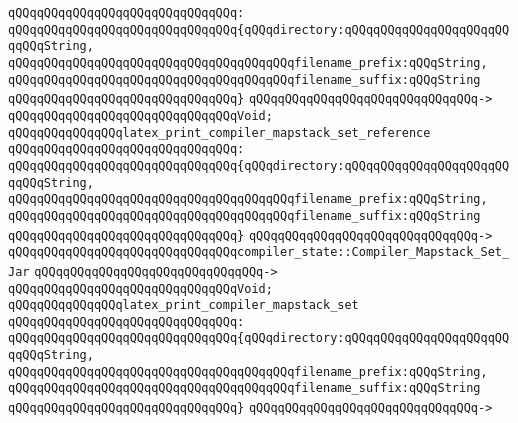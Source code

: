 \verb|qQQqqQQqqQQqqQQqqQQqqQQqqQQqqQQq:|\newline
\verb|qQQqqQQqqQQqqQQqqQQqqQQqqQQqqQQq{qQQqdirectory:qQQqqQQqqQQqqQQqqQQqqQQqqQQqString,|\newline
\verb|qQQqqQQqqQQqqQQqqQQqqQQqqQQqqQQqqQQqqQQqfilename_prefix:qQQqString,|\newline
\verb|qQQqqQQqqQQqqQQqqQQqqQQqqQQqqQQqqQQqqQQqfilename_suffix:qQQqString|\newline
\verb|qQQqqQQqqQQqqQQqqQQqqQQqqQQqqQQq}|\newline
\verb|qQQqqQQqqQQqqQQqqQQqqQQqqQQqqQQq->|\newline
\verb|qQQqqQQqqQQqqQQqqQQqqQQqqQQqqQQqVoid;|\newline
\newline
\verb|qQQqqQQqqQQqqQQqlatex_print_compiler_mapstack_set_reference|\newline
\verb|qQQqqQQqqQQqqQQqqQQqqQQqqQQqqQQq:|\newline
\verb|qQQqqQQqqQQqqQQqqQQqqQQqqQQqqQQq{qQQqdirectory:qQQqqQQqqQQqqQQqqQQqqQQqqQQqString,|\newline
\verb|qQQqqQQqqQQqqQQqqQQqqQQqqQQqqQQqqQQqqQQqfilename_prefix:qQQqString,|\newline
\verb|qQQqqQQqqQQqqQQqqQQqqQQqqQQqqQQqqQQqqQQqfilename_suffix:qQQqString|\newline
\verb|qQQqqQQqqQQqqQQqqQQqqQQqqQQqqQQq}|\newline
\verb|qQQqqQQqqQQqqQQqqQQqqQQqqQQqqQQq->|\newline
\verb|qQQqqQQqqQQqqQQqqQQqqQQqqQQqqQQqcompiler_state::Compiler_Mapstack_Set_Jar|\newline
\verb|qQQqqQQqqQQqqQQqqQQqqQQqqQQqqQQq->|\newline
\verb|qQQqqQQqqQQqqQQqqQQqqQQqqQQqqQQqVoid;|\newline
\newline
\verb|qQQqqQQqqQQqqQQqlatex_print_compiler_mapstack_set|\newline
\verb|qQQqqQQqqQQqqQQqqQQqqQQqqQQqqQQq:|\newline
\verb|qQQqqQQqqQQqqQQqqQQqqQQqqQQqqQQq{qQQqdirectory:qQQqqQQqqQQqqQQqqQQqqQQqqQQqString,|\newline
\verb|qQQqqQQqqQQqqQQqqQQqqQQqqQQqqQQqqQQqqQQqfilename_prefix:qQQqString,|\newline
\verb|qQQqqQQqqQQqqQQqqQQqqQQqqQQqqQQqqQQqqQQqfilename_suffix:qQQqString|\newline
\verb|qQQqqQQqqQQqqQQqqQQqqQQqqQQqqQQq}|\newline
\verb|qQQqqQQqqQQqqQQqqQQqqQQqqQQqqQQq->|\newline
